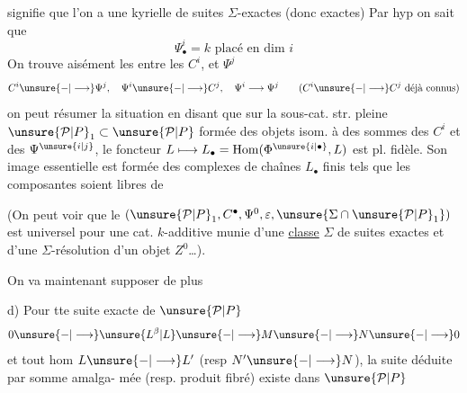 signifie que l'on a une kyrielle de
suites $\Sigma$-exactes (donc exactes)
Par hyp on sait que
\[
\Psi_\bullet^i=k\text{ placé en dim }i
\]
On trouve aisément les  entre les
$C^i$, et  $\Psi^j$
\[
C^i\unsure{-|\longrightarrow}\Psi^j,\quad\Psi^i\unsure{-|\longrightarrow}C^j,\quad
\Psi^i\longrightarrow\Psi^j\qquad(C^i\unsure{-|\longrightarrow}C^j\text{ déjà connus})
\]
on peut résumer la situation en
disant que sur la sous-cat. str. pleine
$\unsure{\mathcal P|P}_1\subset\unsure{\mathcal P|P}$ formée des objets isom. à des sommes
des $C^i$ et des $\Psi^{\unsure{i|j}}$, le foncteur $L\longmapsto L_\bullet=
\operatorname{Hom}(\Phi^{\unsure{i|\bullet}},L)$ est pl. fidèle. Son image essentielle
est formée des complexes de chaînes $L_\bullet$
finis tels que les composantes 
 soient libres de 

(On peut voir que le  $(\unsure{\mathcal P|P}_1,C^\bullet,\Psi^0,\varepsilon,\unsure{\Sigma\cap\unsure{\mathcal P|P}_1})$
est universel pour une cat. $k$-additive
munie d'une \uline{classe} $\Sigma$ de suites exactes et
d'une $\Sigma$-résolution d'un objet  $Z^0$\ldots).

On va maintenant supposer de plus

d) Pour tte suite \inserted{$\Sigma$-}exacte de $\unsure{\mathcal P|P}$
\[
0\unsure{-|\longrightarrow}\unsure{L^\beta|L}\unsure{-|\longrightarrow}M\unsure{-|\longrightarrow}N\unsure{-|\longrightarrow}0
\]
et tout hom $L\unsure{-|\longrightarrow}L'$ (resp $N'\unsure{-|\longrightarrow}N$),
la suite  déduite par somme amalga-
mée (resp. produit fibré) existe dans $\unsure{\mathcal P|P}$

